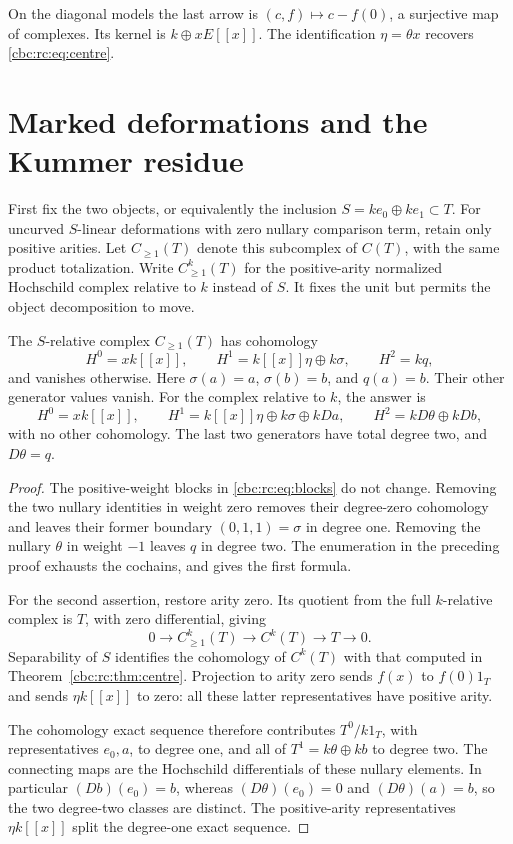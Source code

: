 On the diagonal models the last arrow is
\((c,f)\mapsto c-f(0)\), a surjective map of complexes.
Its kernel is \(k\oplus xE[[x]]\). The identification
\(\eta=\theta x\) recovers \eqref{cbc:rc:eq:centre}.

\section{Marked deformations and the Kummer residue}
\label{cbc:rc:subsec:deformation}

First fix the two objects, or equivalently the inclusion
\(S=ke_0\oplus ke_1\subset T\).  For uncurved \(S\)-linear
deformations with zero nullary comparison term, retain only positive
arities.  Let \(C_{\geq1}(T)\) denote this subcomplex of \(C(T)\),
with the same product totalization.  Write \(C^k_{\geq1}(T)\) for
the positive-arity normalized Hochschild complex relative to \(k\)
instead of \(S\). It fixes the unit but permits the object
decomposition to move.

\begin{proposition}\label{cbc:rc:prop:positive-arity}
The \(S\)-relative complex \(C_{\geq1}(T)\) has cohomology
\[
 H^0=xk[[x]],\qquad
 H^1=k[[x]]\eta\oplus k\sigma,\qquad
 H^2=kq,
\]
and vanishes otherwise.  Here \(\sigma(a)=a\), \(\sigma(b)=b\),
and \(q(a)=b\). Their other generator values vanish.
For the complex relative to \(k\), the answer is
\[
 H^0=xk[[x]],\qquad
 H^1=k[[x]]\eta\oplus k\sigma\oplus kDa,\qquad
 H^2=kD\theta\oplus kDb,
\]
with no other cohomology.  The last two generators have total degree
two, and \(D\theta=q\).
\end{proposition}
\begin{proof}
The positive-weight blocks in \eqref{cbc:rc:eq:blocks} do not change.
Removing the two nullary identities in weight zero removes their
degree-zero cohomology and leaves their former boundary
\((0,1,1)=\sigma\) in degree one.
Removing the nullary \(\theta\) in weight \(-1\) leaves \(q\) in
degree two.  The enumeration in the preceding proof exhausts the
cochains, and gives the first formula.

For the second assertion, restore arity zero.  Its quotient from the
full \(k\)-relative complex is \(T\), with zero differential, giving
\[
 0\longrightarrow C^k_{\geq1}(T)\longrightarrow C^k(T)
   \longrightarrow T\longrightarrow0.
\]
Separability of \(S\) identifies the cohomology of \(C^k(T)\) with
that computed in Theorem~\ref{cbc:rc:thm:centre}.  Projection to arity
zero sends \(f(x)\) to \(f(0)1_T\) and sends
\(\eta k[[x]]\) to zero: all these latter representatives have
positive arity.

The cohomology exact sequence therefore contributes
\(T^0/k1_T\), with representatives \(e_0,a\), to degree one, and
all of \(T^1=k\theta\oplus kb\) to degree two.
The connecting maps are the Hochschild differentials of these
nullary elements.  In particular \((Db)(e_0)=b\), whereas
\((D\theta)(e_0)=0\) and \((D\theta)(a)=b\), so the two
degree-two classes are distinct.  The positive-arity representatives
\(\eta k[[x]]\) split the degree-one exact sequence.
\end{proof}

